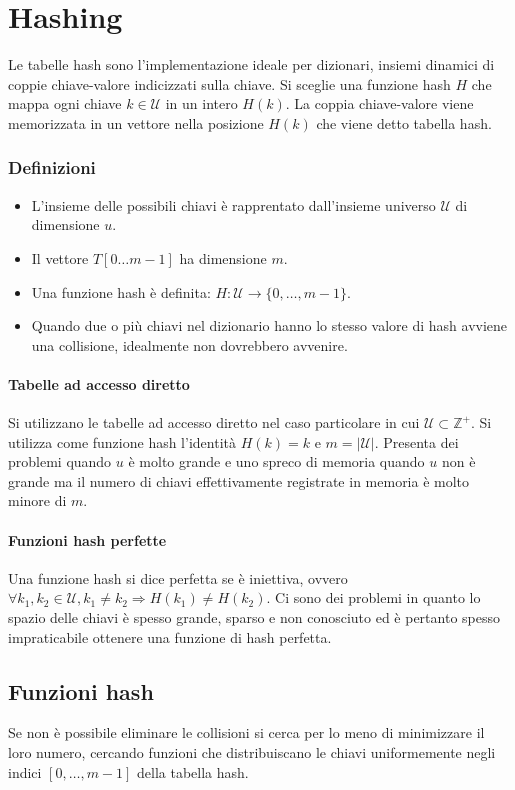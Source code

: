 \chapter{Hashing}
Le tabelle hash sono l'implementazione ideale per dizionari, insiemi dinamici di coppie chiave-valore indicizzati sulla chiave. Si sceglie una funzione hash
$H$ che mappa ogni chiave $k\in\mathcal{U}$ in un intero $H(k)$. La coppia chiave-valore viene memorizzata in un vettore nella posizione $H(k)$ che viene
detto tabella hash.
\subsection{Definizioni}
\begin{itemize}
    \item L'insieme delle possibili chiavi \`e rapprentato dall'insieme universo $\mathcal{U}$ di dimensione $u$.
    \item Il vettore $T[0\dots m-1]$ ha dimensione $m$.
    \item Una funzione hash \`e definita: $H: \mathcal{U}\rightarrow\{0,\dots, m-1\}$.
    \item Quando due o pi\`u chiavi nel dizionario hanno lo stesso valore di hash avviene una collisione, idealmente non dovrebbero avvenire.
\end{itemize}
\subsubsection{Tabelle ad accesso diretto}
Si utilizzano le tabelle ad accesso diretto nel caso particolare in cui $\mathcal{U}\subset\mathbb{Z}^+$. Si utilizza come funzione hash l'identit\`a
$H(k)=k$ e $m=|\mathcal{U}|$. Presenta dei problemi quando $u$ \`e molto grande e uno spreco di memoria quando $u$ non \`e grande ma il numero di chiavi
effettivamente registrate in memoria \`e molto minore di $m$.
\subsubsection{Funzioni hash perfette}
Una funzione hash si dice perfetta se \`e iniettiva, ovvero $\forall k_1, k_2\in\mathcal{U}, k_1\neq k_2\Rightarrow H(k_1)\neq H(k_2)$. Ci sono dei problemi
in quanto lo spazio delle chiavi \`e spesso grande, sparso e non conosciuto ed \`e pertanto spesso impraticabile ottenere una funzione di hash perfetta.
\section{Funzioni hash}
Se non \`e possibile eliminare le collisioni si cerca per lo meno di minimizzare il loro numero, cercando funzioni che distribuiscano le chiavi
uniformemente negli indici $[0,\dots,m-1]$ della tabella hash.
